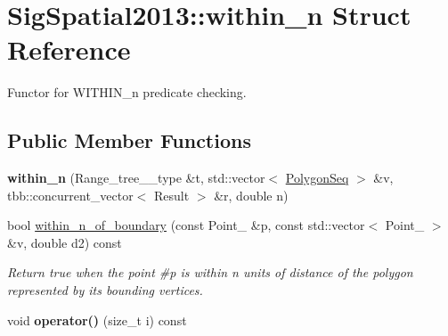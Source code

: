\hypertarget{structSigSpatial2013_1_1within__n}{\section{Sig\-Spatial2013\-:\-:within\-\_\-n Struct Reference}
\label{structSigSpatial2013_1_1within__n}
}


Functor for W\-I\-T\-H\-I\-N\-\_\-n predicate checking.  


\subsection*{Public Member Functions}
\begin{DoxyCompactItemize}
\item 
\hypertarget{structSigSpatial2013_1_1within__n_ad11ca1ba7328173d83ffe4fb6264e6ef}{{\bfseries within\-\_\-n} (Range\-\_\-tree\-\_\-\_\-type \&t, std\-::vector$<$ \hyperlink{structSigSpatial2013_1_1PolygonSeq}{Polygon\-Seq} $>$ \&v, tbb\-::concurrent\-\_\-vector$<$ Result $>$ \&r, double n)}\label{structSigSpatial2013_1_1within__n_ad11ca1ba7328173d83ffe4fb6264e6ef}

\item 
bool \hyperlink{structSigSpatial2013_1_1within__n_a9ddb1790f7e5549a46926caaf3d25ed0}{within\-\_\-n\-\_\-of\-\_\-boundary} (const Point\-\_ \&p, const std\-::vector$<$ Point\-\_ $>$ \&v, double d2) const 
\begin{DoxyCompactList}\small\item\em Return true when the point \#p is within n units of distance of the polygon represented by its bounding vertices. \end{DoxyCompactList}\item 
\hypertarget{structSigSpatial2013_1_1within__n_acdd3583e4b798bed14929fb40746d4a5}{void {\bfseries operator()} (size\-\_\-t i) const }\label{structSigSpatial2013_1_1within__n_acdd3583e4b798bed14929fb40746d4a5}

\end{DoxyCompactItemize}
